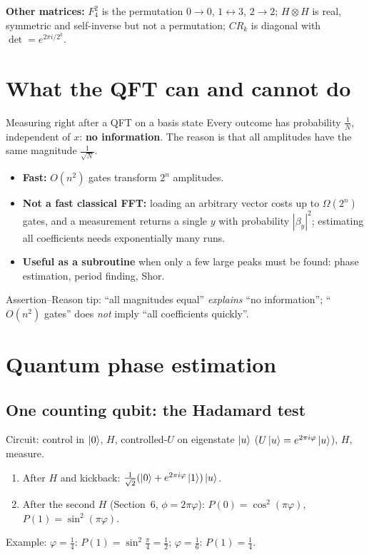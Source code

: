 \documentclass[11pt,a4paper,openany]{book}
\newenvironment{steps}{\begin{enumerate}[label=\textbf{Step \arabic*.}, leftmargin=4.2em, itemsep=2pt]}{\end{enumerate}}
\begin{document}
\textbf{Other matrices:} $F_4^2$ is the permutation $0\to0$, $1\leftrightarrow3$, $2\to2$; $H\otimes H$ is real, symmetric and self-inverse
but not a permutation; $CR_k$ is diagonal with $\det = e^{2\pi i/2^k}$.

\section{What the QFT can and cannot do}
\begin{keyres}{Measuring right after a QFT on a basis state}
Every outcome has probability $\frac1N$, independent of $x$: \textbf{no information}. The reason is that all amplitudes have
the same magnitude $\frac{1}{\sqrt N}$.
\end{keyres}
\begin{itemize}[itemsep=2pt]
\item \textbf{Fast:} $O(n^2)$ gates transform $2^n$ amplitudes.
\item \textbf{Not a fast classical FFT:} loading an arbitrary vector costs up to $\Omega(2^n)$ gates, and a measurement returns a
      single $y$ with probability $|\beta_y|^2$; estimating all coefficients needs exponentially many runs.
\item \textbf{Useful as a subroutine} when only a few large peaks must be found: phase estimation, period finding, Shor.
\end{itemize}
Assertion--Reason tip: ``all magnitudes equal'' \emph{explains} ``no information''; ``$O(n^2)$ gates'' does \emph{not} imply ``all
coefficients quickly''.

\section{Quantum phase estimation}
\subsection{One counting qubit: the Hadamard test}
Circuit: control in $\ket0$, $H$, controlled-$U$ on eigenstate $\ket u$ ($U\ket u = e^{2\pi i\varphi}\ket u$), $H$, measure.
\begin{steps}
\item After $H$ and kickback: $\frac{1}{\sqrt2}(\ket0 + e^{2\pi i\varphi}\ket1)\ket u$.
\item After the second $H$ (Section~6, $\phi = 2\pi\varphi$): $P(0) = \cos^2(\pi\varphi)$, $P(1) = \sin^2(\pi\varphi)$.
\end{steps}
Example: $\varphi = \frac14$: $P(1) = \sin^2\frac\pi4 = \frac12$; $\varphi = \frac16$: $P(1) = \frac14$.
\end{document}
